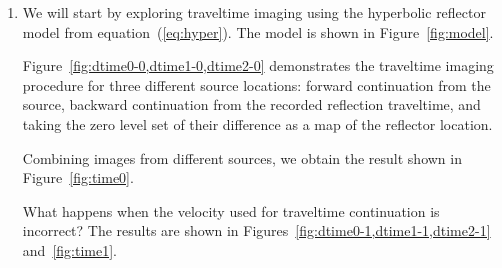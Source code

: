 \begin{enumerate}
\item We will start by exploring traveltime imaging using the
  hyperbolic reflector model from equation~(\ref{eq:hyper}). The model
  is shown in Figure~\ref{fig:model}.


{\small
  }

  Figure~\ref{fig:dtime0-0,dtime1-0,dtime2-0} demonstrates the
  traveltime imaging procedure for three different source locations:
  forward continuation from the source, backward continuation from the
  recorded reflection traveltime, and taking the zero level set of
  their difference as a map of the reflector location.


  Combining images from different sources, we obtain the result shown
  in Figure~\ref{fig:time0}.


  What happens when the velocity used for traveltime continuation is
  incorrect? The results are shown in
  Figures~\ref{fig:dtime0-1,dtime1-1,dtime2-1} and~\ref{fig:time1}.




\end{enumerate}
